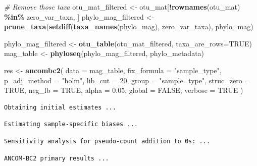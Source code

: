 \documentclass[
]{book}
\newenvironment{Shaded}{\begin{snugshade}}{\end{snugshade}}
\newcommand{\AttributeTok}[1]{\textcolor[rgb]{0.13,0.29,0.53}{#1}}
\newcommand{\CommentTok}[1]{\textcolor[rgb]{0.56,0.35,0.01}{\textit{#1}}}
\newcommand{\ConstantTok}[1]{\textcolor[rgb]{0.56,0.35,0.01}{#1}}
\newcommand{\DecValTok}[1]{\textcolor[rgb]{0.00,0.00,0.81}{#1}}
\newcommand{\FloatTok}[1]{\textcolor[rgb]{0.00,0.00,0.81}{#1}}
\newcommand{\FunctionTok}[1]{\textcolor[rgb]{0.13,0.29,0.53}{\textbf{#1}}}
\newcommand{\NormalTok}[1]{#1}
\newcommand{\OtherTok}[1]{\textcolor[rgb]{0.56,0.35,0.01}{#1}}
\newcommand{\SpecialCharTok}[1]{\textcolor[rgb]{0.81,0.36,0.00}{\textbf{#1}}}
\newcommand{\StringTok}[1]{\textcolor[rgb]{0.31,0.60,0.02}{#1}}
\begin{document}
\begin{Shaded}
\begin{Highlighting}[]
\CommentTok{\# Remove those taxa}
\NormalTok{otu\_mat\_filtered }\OtherTok{\textless{}{-}}\NormalTok{ otu\_mat[}\SpecialCharTok{!}\FunctionTok{rownames}\NormalTok{(otu\_mat) }\SpecialCharTok{\%in\%}\NormalTok{ zero\_var\_taxa, ]}
\NormalTok{phylo\_mag\_filtered }\OtherTok{\textless{}{-}} \FunctionTok{prune\_taxa}\NormalTok{(}\FunctionTok{setdiff}\NormalTok{(}\FunctionTok{taxa\_names}\NormalTok{(phylo\_mag), zero\_var\_taxa), phylo\_mag)}

\NormalTok{phylo\_mag\_filtered }\OtherTok{\textless{}{-}} \FunctionTok{otu\_table}\NormalTok{(otu\_mat\_filtered, }\AttributeTok{taxa\_are\_rows=}\ConstantTok{TRUE}\NormalTok{)}
\NormalTok{mag\_table }\OtherTok{\textless{}{-}} \FunctionTok{phyloseq}\NormalTok{(phylo\_mag\_filtered, phylo\_metadata)}

\NormalTok{res }\OtherTok{\textless{}{-}} \FunctionTok{ancombc2}\NormalTok{(}
  \AttributeTok{data =}\NormalTok{ mag\_table,}
  \AttributeTok{fix\_formula =} \StringTok{"sample\_type"}\NormalTok{,}
  \AttributeTok{p\_adj\_method =} \StringTok{"holm"}\NormalTok{,}
  \AttributeTok{lib\_cut =} \DecValTok{20}\NormalTok{,}
  \AttributeTok{group =} \StringTok{"sample\_type"}\NormalTok{,}
  \AttributeTok{struc\_zero =} \ConstantTok{TRUE}\NormalTok{,}
  \AttributeTok{neg\_lb =} \ConstantTok{TRUE}\NormalTok{,}
  \AttributeTok{alpha =} \FloatTok{0.05}\NormalTok{,}
  \AttributeTok{global =} \ConstantTok{FALSE}\NormalTok{,}
  \AttributeTok{verbose =} \ConstantTok{TRUE}
\NormalTok{)}
\end{Highlighting}
\end{Shaded}

\begin{verbatim}
Obtaining initial estimates ...
\end{verbatim}

\begin{verbatim}
Estimating sample-specific biases ...
\end{verbatim}

\begin{verbatim}
Sensitivity analysis for pseudo-count addition to 0s: ...
\end{verbatim}

\begin{verbatim}
ANCOM-BC2 primary results ...
\end{verbatim}
\end{document}
